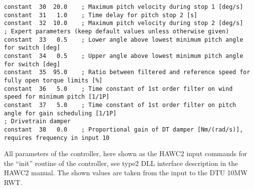 \begin{table}[b]
\begin{center}
\begin{verbatim}
constant  30  20.0    ; Maximum pitch velocity during stop 1 [deg/s]
constant  31   1.0    ; Time delay for pitch stop 2 [s]
constant  32  10.0    ; Maximum pitch velocity during stop 2 [deg/s]
; Expert parameters (keep default values unless otherwise given)
constant  33   0.5    ; Lower angle above lowest minimum pitch angle for switch [deg]
constant  34   0.5    ; Upper angle above lowest minimum pitch angle for switch [deg]
constant  35  95.0    ; Ratio between filtered and reference speed for fully open torque limits [%]
constant  36   5.0    ; Time constant of 1st order filter on wind speed for minimum pitch [1/1P]
constant  37   5.0    ; Time constant of 1st order filter on pitch angle for gain scheduling [1/1P]
; Drivetrain damper
constant  38   0.0    ; Proportional gain of DT damper [Nm/(rad/s)], requires frequency in input 10
\end{verbatim}
\caption{All parameters of the controller, here shown as the HAWC2 input commands for the ``init'' routine of the controller, see type2 DLL interface description in the HAWC2 manual. The shown values are taken from the input to the DTU 10MW RWT. \label{t:init}}
\end{center}
\end{table}


